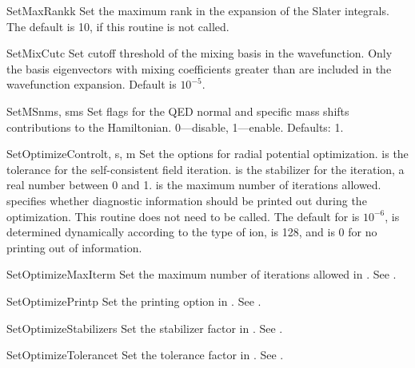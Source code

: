 \begin{fundesc}{SetMaxRank}{k}
Set the maximum rank in the expansion of the Slater integrals. The default is
10, if this routine is not called.
\end{fundesc}

\begin{fundesc}{SetMixCut}{c}
Set cutoff threshold of the mixing basis in the wavefunction. Only the basis
eigenvectors with mixing coefficients greater than  are included in the
wavefunction expansion. Default is $10^{-5}$.
\end{fundesc}

\begin{fundesc}{SetMS}{nms, sms}
Set flags for the QED normal and specific mass shifts contributions to the
Hamiltonian. 0---disable, 1---enable. Defaults: 1.
\end{fundesc}

\begin{fundesc}{SetOptimizeControl}{t, s, m}
Set the options for radial potential optimization.  is the tolerance for
the self-consistent field iteration.  is the stabilizer for the
iteration, a real number between 0 and 1.  is the maximum number of
iterations allowed.   specifies whether diagnostic information should be
printed out during the optimization. This routine does not need to be called.
The default for  is $10^{-6}$,  is determined dynamically
according to the type of ion,  is 128, and  is 0 for no printing
out of information.
\end{fundesc}

\begin{fundesc}{SetOptimizeMaxIter}{m}
Set the maximum number of iterations allowed in . See
.
\end{fundesc}

\begin{fundesc}{SetOptimizePrint}{p}
Set the printing option in . See
.
\end{fundesc}

\begin{fundesc}{SetOptimizeStabilizer}{s}
Set the stabilizer factor in . See
.
\end{fundesc}

\begin{fundesc}{SetOptimizeTolerance}{t}
Set the tolerance factor in . See
.
\end{fundesc}

